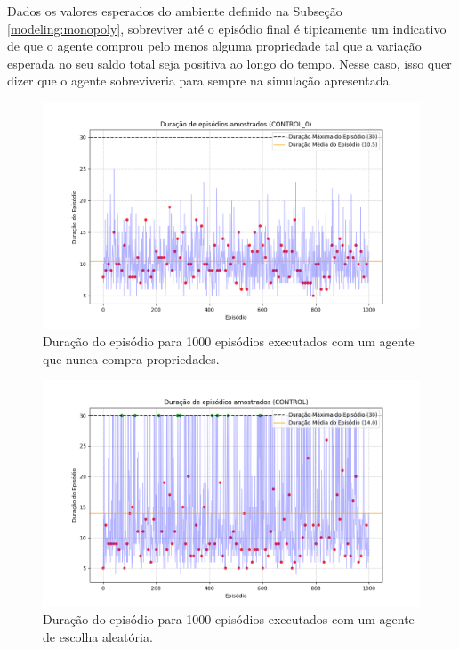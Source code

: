 \documentclass[conference]{IEEEtran}
\begin{document}
Dados os valores esperados do ambiente definido na Subseção \ref{modeling:monopoly}, sobreviver até o episódio final é tipicamente um indicativo de que o agente comprou pelo menos alguma propriedade tal que a variação esperada no seu saldo total seja positiva ao longo do tempo. Nesse caso, isso quer dizer que o agente sobreviveria para sempre na simulação apresentada.

\begin{figure}[htpb]
    \centering
    \includegraphics[width=1\linewidth]{figures/episode_lengths_control_0.png}
    \caption{Duração do episódio para 1000 episódios executados com um agente que nunca compra propriedades.}
    \label{fig:ep_lens_control_0}
\end{figure}

\begin{figure}[htpb]
    \centering
    \includegraphics[width=1\linewidth]{figures/episode_lengths_control.png}
    \caption{Duração do episódio para 1000 episódios executados com um agente de escolha aleatória.}
    \label{fig:ep_lens_control}
\end{figure}
\end{document}

